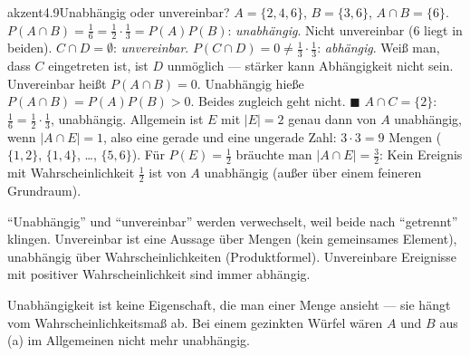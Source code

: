 \begin{loesungkarte}{akzent}{4.9}{Unabhängig oder unvereinbar?}
$A = \{2, 4, 6\}$, $B = \{3, 6\}$, $A\cap B = \{6\}$. $P(A\cap B) = \frac16 = \frac12\cdot\frac13 = P(A)P(B)$: \emph{unabhängig}. Nicht unvereinbar ($6$ liegt in beiden).
$C\cap D = \emptyset$: \emph{unvereinbar}. $P(C\cap D) = 0\neq\frac13\cdot\frac13$: \emph{abhängig}. Weiß man, dass $C$ eingetreten ist, ist $D$ unmöglich --- stärker kann Abhängigkeit nicht sein.
Unvereinbar heißt $P(A\cap B) = 0$. Unabhängig hieße $P(A\cap B) = P(A)P(B) > 0$. Beides zugleich geht nicht. $\blacksquare$
$A\cap C = \{2\}$: $\frac16 = \frac12\cdot\frac13$, unabhängig. Allgemein ist $E$ mit $|E| = 2$ genau dann von $A$ unabhängig, wenn $|A\cap E| = 1$, also eine gerade und eine ungerade Zahl: $3\cdot3 = 9$ Mengen ($\{1, 2\}$, $\{1, 4\}$, \dots, $\{5, 6\}$). Für $P(E) = \frac12$ bräuchte man $|A\cap E| = \frac32$: Kein Ereignis mit Wahrscheinlichkeit $\frac12$ ist von $A$ unabhängig (außer über einem feineren Grundraum).
\begin{fehler}\kastentext
\enquote{Unabhängig} und \enquote{unvereinbar} werden verwechselt, weil beide nach \enquote{getrennt} klingen. Unvereinbar ist eine Aussage über Mengen (kein gemeinsames Element), unabhängig über Wahrscheinlichkeiten (Produktformel). Unvereinbare Ereignisse mit positiver Wahrscheinlichkeit sind immer abhängig.
\end{fehler}
\begin{mitnehmen}\kastentext
Unabhängigkeit ist keine Eigenschaft, die man einer Menge ansieht --- sie hängt vom Wahrscheinlichkeitsmaß ab. Bei einem gezinkten Würfel wären $A$ und $B$ aus (a) im Allgemeinen nicht mehr unabhängig.
\end{mitnehmen}
\end{loesungkarte}

